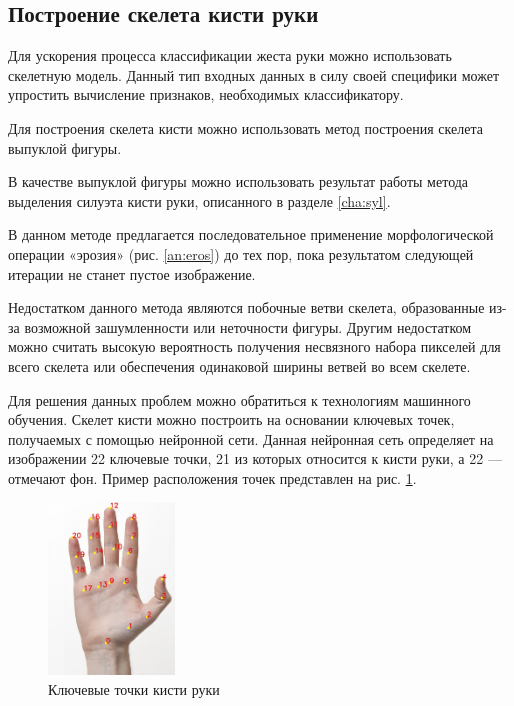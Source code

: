 \subsection{Построение скелета кисти руки}

Для ускорения процесса классификации жеста руки можно использовать скелетную модель. Данный тип входных данных в силу своей специфики может упростить вычисление признаков, необходимых классификатору.

Для построения скелета кисти можно использовать метод построения скелета выпуклой фигуры\cite{DIP}.

В качестве выпуклой фигуры можно использовать результат работы метода выделения силуэта кисти руки, описанного в разделе \ref{cha:syl}.

В данном методе предлагается последовательное применение морфологической операции «эрозия» (рис. \ref{an:eros}) до тех пор, пока результатом следующей итерации не станет пустое изображение.

Недостатком данного метода являются побочные ветви скелета, образованные из-за возможной зашумленности или неточности фигуры. Другим недостатком можно считать высокую вероятность получения несвязного набора пикселей для всего скелета или обеспечения одинаковой ширины ветвей во всем скелете.

Для решения данных проблем можно обратиться к технологиям машинного обучения. Скелет кисти можно построить на основании ключевых точек, получаемых с помощью нейронной сети\cite{DNN}. Данная нейронная сеть определяет на изображении 22 ключевые точки, 21 из которых относится к кисти руки, а 22 — отмечают фон. Пример расположения точек представлен на рис. \ref{an:handpose}.

\begin{figure}[!h]
	\centering
	\includegraphics[width=0.3\textwidth]{inc/img/handpose-demo-keypoints}
	\caption{Ключевые точки кисти руки}
	\label{an:handpose}
\end{figure}


